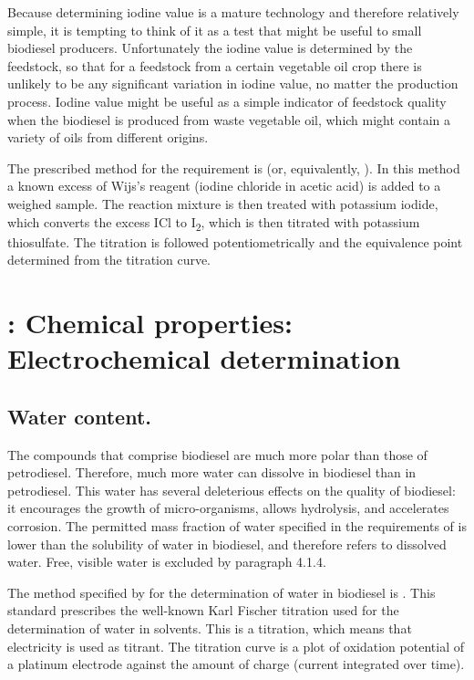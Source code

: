 Because determining iodine value is a mature technology and therefore relatively
simple, it is tempting to think of it as a test that might be useful to small
biodiesel producers. Unfortunately the iodine value is determined by the
feedstock, so that for a feedstock from a certain vegetable oil crop there is
unlikely to be any significant variation in iodine value, no matter the
production process. Iodine value might be useful as a simple indicator of
feedstock quality when the biodiesel is produced from waste vegetable oil, which
might contain a variety of oils from different origins.

The prescribed method for the requirement is  (or, equivalently,
). In this method a known excess of Wijs's reagent (iodine
chloride in acetic acid) is added to a weighed sample. The reaction mixture is
then treated with potassium iodide, which converts the excess ICl to
I\textsubscript{2}, which is then titrated with potassium thiosulfate. The
titration is followed potentiometrically and the equivalence point determined
from the titration curve.

\section{\texorpdfstring{}{SANS 1935}: Chemical properties: Electrochemical determination}

\subsection{Water content.}

The compounds that comprise biodiesel are much more polar than those of
petro\-diesel. Therefore, much more water can dissolve in biodiesel than in
petrodiesel. This water has several deleterious effects on the quality of
biodiesel: it encourages the growth of micro-organisms, allows hydrolysis, and
accelerates corrosion. The permitted mass fraction of water specified in the
requirements of  is lower than the solubility of water in
biodiesel, and therefore refers to dissolved water. Free, visible water is
excluded by paragraph 4.1.4.

The method specified by  for the determination of water in
biodiesel is . This standard prescribes the well-known Karl
Fischer titration used for the determination of water in solvents. This is a
 titration, which means that electricity is used as
titrant. The titration curve is a plot of oxidation potential of a platinum
electrode against the amount of charge (current integrated over time).


